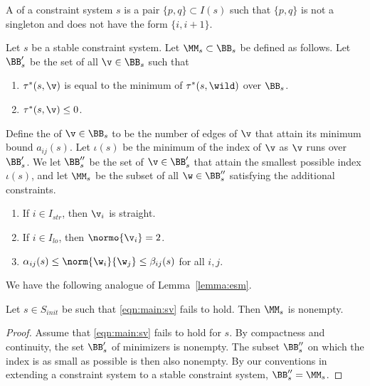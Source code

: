 A  of a constraint system $s$ is a pair $\{p,q\}\subset I(s)$
such that $\{p,q\}$ is not a singleton and does not have the form $\{i,i+1\}$.

\begin{definition}
Let $s$ be a stable constraint system.
Let $\MM_{s}\subset \BB_{s}$ be defined as follows.
Let $\BB'_{s}$ be the set of all $\v\in \BB_{s}$ such that
\begin{enumerate}
\item $\tau^*(s,\v)$ is equal to the minimum of $\tau^*(s,\wild)$ over $\BB_{s}$.
\item $\tau^*(s,\v)\le 0$.
\end{enumerate}
Define the  of $\v\in \BB_s$ to be the number of edges of $\v$
that attain its minimum bound $a_{i j}(s)$.  Let $\iota(s)$ be the minimum
of the index of $\v$ as $\v$ runs over $\BB'_s$.  
We let $\BB''_{s}$  be the set of $\v\in \BB'_{s}$ that attain
the smallest possible index $\iota(s)$,
and let $\MM_s$ be the subset of all $\w\in\BB''_s$ satisfying the additional
constraints.
\begin{enumerate}
\item If $i\in I_{str}$,  then $\v_i$ is straight.
\item If $i\in I_{lo}$,  then $\normo{\v_i}=2$.
\item $\alpha_{ij}(s)\le \norm{\w_i}{\w_j}\le \beta_{ij}(s)$ for all $i,j$.
\end{enumerate}
\end{definition}



We have the following analogue of Lemma~\ref{lemma:esm}.

\begin{lemma}\label{lemma:init}
Let $s\in S_{init}$ be such that
\eqref{eqn:main:sv} fails to hold.
Then $\MM_s$ is nonempty.
\end{lemma}

\begin{proof}  Assume that \eqref{eqn:main:sv} fails to hold for
$s$.  By compactness and continuity, the set 
$\BB'_s$ of minimizers is nonempty.   
The subset $\BB''_s$ on which the index is as small as possible
is then also nonempty.  By our conventions in extending a constraint
system to a stable constraint system, $\BB''_s = \MM_s$.
\end{proof}


